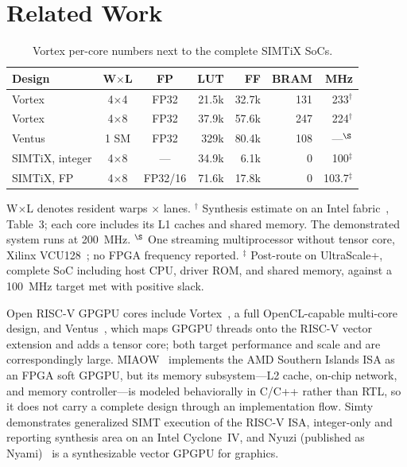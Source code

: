 \documentclass[10pt,conference]{IEEEtran}
\begin{document}
\section{Related Work}\label{sec:related}
\begin{table}[t]
\caption{Vortex per-core numbers next to the complete SIMTiX SoCs.}
\label{tab:related}
\centering
\footnotesize
\begin{tabular}{lccrrrr}
\toprule
Design & W$\times$L & FP & LUT & FF & BRAM & MHz\\
\midrule
Vortex~\cite{vortex}   & 4$\times$4 & FP32     & 21.5k & 32.7k & 131 & 233$^{\dagger}$\\
Vortex~\cite{vortex}   & 4$\times$8 & FP32     & 37.9k & 57.6k & 247 & 224$^{\dagger}$\\
Ventus~\cite{ventus25} & 1 SM       & FP32     & 329k\phantom{0} & 80.4k & 108 & ---$^{\S}$\\
SIMTiX, integer        & 4$\times$8 & ---      & 34.9k & \phantom{0}6.1k & 0 & 100$^{\ddagger}$\\
SIMTiX, FP             & 4$\times$8 & FP32/16  & 71.6k & 17.8k & 0 & 103.7$^{\ddagger}$\\
\bottomrule
\end{tabular}

\vspace{3pt}
\begin{minipage}{\columnwidth}
\footnotesize
W$\times$L denotes resident warps $\times$ lanes.
$^{\dagger}$ Synthesis estimate on an Intel fabric~\cite{vortex}, Table~3; each
core includes its L1 caches and shared memory. The demonstrated system runs at
200~MHz. $^{\S}$ One streaming multiprocessor without tensor core, Xilinx
VCU128~\cite{ventus25}; no FPGA frequency reported. $^{\ddagger}$ Post-route on
UltraScale+, complete SoC including host CPU, driver ROM, and shared memory,
against a 100~MHz target met with positive slack.
\end{minipage}
\end{table}
Open RISC-V GPGPU cores include Vortex~\cite{vortex}, a full OpenCL-capable
multi-core design, and Ventus~\cite{ventus,ventus25}, which maps GPGPU threads
onto the RISC-V vector extension and adds a tensor core; both target performance
and scale and are correspondingly large. MIAOW~\cite{miaow} implements the AMD
Southern Islands ISA as an FPGA soft GPGPU, but its memory subsystem---L2 cache,
on-chip network, and memory controller---is modeled behaviorally in C/C++ rather
than RTL, so it does not carry a complete design through an implementation flow.
Simty~\cite{simty} demonstrates generalized SIMT execution of the RISC-V ISA,
integer-only and reporting synthesis area on an Intel Cyclone~IV, and Nyuzi
(published as Nyami)~\cite{nyuzi} is a synthesizable vector GPGPU for graphics.
\end{document}
